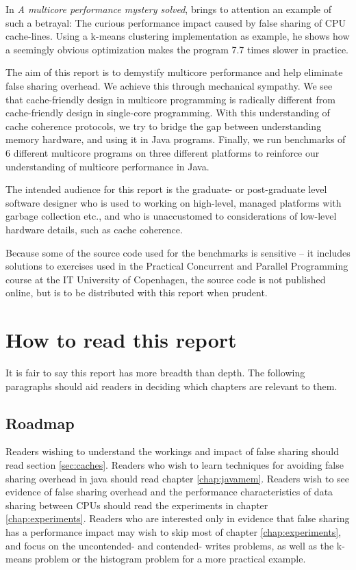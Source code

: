 In \textit{A multicore performance mystery solved}\cite{mystery},
\citeauthor{mystery} brings to attention an example of such a betrayal: The
curious performance impact caused by false sharing of CPU cache-lines. Using a
k-means clustering implementation as example, he shows how a seemingly obvious
optimization makes the program 7.7 times slower in practice.

The aim of this report is to demystify multicore performance and help eliminate
false sharing overhead. We achieve this through mechanical sympathy. We see that
cache-friendly design in multicore programming is radically different from
cache-friendly design in single-core programming. With this understanding of
cache coherence protocols, we try to bridge the gap between understanding
memory hardware, and using it in Java programs. Finally, we run
benchmarks of 6 different multicore programs on three different platforms to
reinforce our understanding of multicore performance in Java.

The intended audience for this report is the graduate- or post-graduate level
software designer who is used to working on high-level, managed platforms with
garbage collection etc., and who is unaccustomed to considerations of low-level
hardware details, such as cache coherence.

Because some of the source code used for the benchmarks is sensitive -- it
includes solutions to exercises used in the Practical Concurrent and
Parallel Programming course at the IT University of Copenhagen, the source code
is not published online, but is to be distributed with this report when prudent.

\chapter{How to read this report}
It is fair to say this report has more breadth than depth. The following
paragraphs should aid readers in deciding which chapters are relevant to them.

\section{Roadmap}
Readers wishing to understand the workings and impact of false sharing should
read section \ref{sec:caches}. Readers who wish to learn techniques for avoiding
false sharing overhead in java should read chapter \ref{chap:javamem}. Readers
wish to see evidence of false sharing overhead and the performance
characteristics of data sharing between CPUs should read the experiments in
chapter \ref{chap:experiments}. Readers who are interested only in evidence that
false sharing has a performance impact may wish to skip most of chapter
\ref{chap:experiments}, and
focus on the uncontended- and contended- writes problems, as well as the k-means
problem or the histogram problem for a more practical example.

